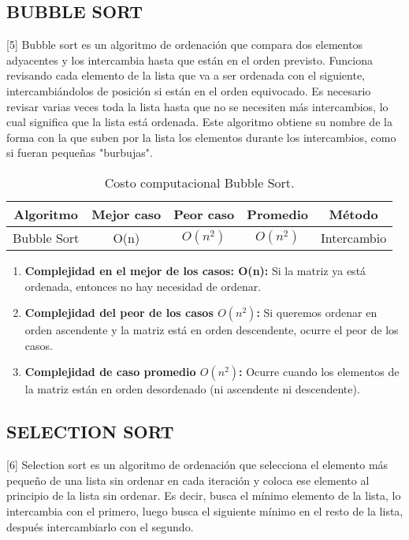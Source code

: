 \documentclass{article}
\begin{document}
\subsection{BUBBLE SORT}
[5] Bubble sort es un algoritmo de ordenación que compara dos elementos adyacentes y los intercambia hasta que están en el orden previsto. Funciona revisando cada elemento de la lista que va a ser ordenada con el siguiente, intercambiándolos de posición si están en el orden equivocado. Es necesario revisar varias veces toda la lista hasta que no se necesiten más intercambios, lo cual significa que la lista está ordenada. Este algoritmo obtiene su nombre de la forma con la que suben por la lista los elementos durante los intercambios, como si fueran pequeñas "burbujas".

    \begin{table}[H]
        \centering
        \begin{tabular}{||c c c c c||} 
         \hline
         \textbf{Algoritmo} & \textbf{Mejor caso} & \textbf{Peor caso} & \textbf{Promedio} & \textbf{Método} \\ [0.5ex] 
         \hline\hline
         Bubble Sort & O(n) & \(O(n^2)\) & \(O(n^2)\) & Intercambio \\ [0.5ex] 
         \hline
        \end{tabular}
        \caption{Costo computacional Bubble Sort.}
        \label{table:dataBubbleSort}
    \end{table}
    
    \begin{enumerate}
            \item \textbf{Complejidad en el mejor de los casos: O(n):} Si la matriz ya está ordenada, entonces no hay necesidad de ordenar.
            
            \item \textbf{Complejidad del peor de los casos \(O(n^2)\):} Si queremos ordenar en orden ascendente y la matriz está en orden descendente, ocurre el peor de los casos.
            
            \item \textbf{Complejidad de caso promedio \(O(n^2)\):} Ocurre cuando los elementos de la matriz están en orden desordenado (ni ascendente ni descendente).
    \end{enumerate}

\subsection{SELECTION SORT}
[6] Selection sort es un algoritmo de ordenación que selecciona el elemento más pequeño de una lista sin ordenar en cada iteración y coloca ese elemento al principio de la lista sin ordenar. Es decir, busca el mínimo elemento de la lista, lo intercambia con el primero, luego busca el siguiente mínimo en el resto de la lista, después intercambiarlo con el segundo.
\end{document}
